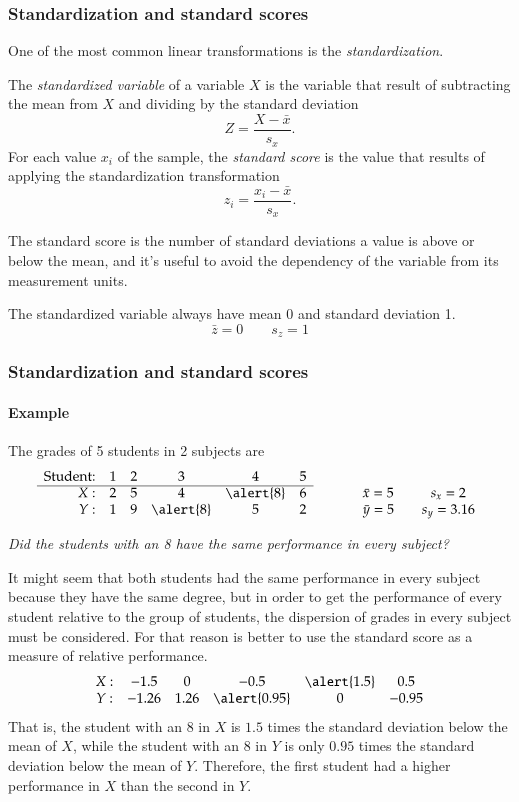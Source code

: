 \begin{frame}
\frametitle{Standardization and standard scores}
One of the most common linear transformations is the \emph{standardization}.
\begin{definition}
The \emph{standardized variable} of a variable $X$ is the variable that result of subtracting the mean from $X$ and
dividing by the standard deviation 
\[
Z=\frac{X-\bar x}{s_{x}}.
\]
For each value $x_i$ of the sample, the \emph{standard score} is the value that results of applying the standardization
transformation
\[
z_i=\frac{x_i-\bar x}{s_{x}}.
\]
\end{definition}

The standard score is the number of standard deviations a value is above or below the mean, and it's useful to avoid
the dependency of the variable from its measurement units.

The standardized variable always have mean 0 and standard deviation 1.  
\[
\bar z = 0 \qquad s_{z} = 1
\]
\end{frame}


\begin{frame}
\frametitle{Standardization and standard scores}
\framesubtitle{Example}
The grades of 5 students in 2 subjects are
\[
\begin{array}{rccccccccc}
\mbox{Student:} & 1 & 2 & 3 & 4 & 5\\ \cline{1-6}
X: & 2 & 5 & 4 & \alert{8} & 6 & \qquad & \bar x = 5 & \quad s_x = 2\\
Y: & 1 & 9 & \alert{8} & 5 & 2 & \qquad & \bar y = 5 & \quad s_y = 3.16\\
\end{array}
\]
\begin{center}
\emph{Did the students with an 8 have the same performance in every subject?}
\end{center}
It might seem that both students had the same performance in every subject because they have the same
degree, but in order to get the performance of every student relative to the group of students, the dispersion
of grades in every subject must be considered.
For that reason is better to use the standard score as a measure of relative performance. 
\[
\begin{array}{cccccc}
X: & -1.5 & 0 & -0.5 & \alert{1.5} & 0.5 \\
Y: & -1.26 & 1.26 & \alert{0.95} & 0 & -0.95\\
\end{array}
\]
That is, the student with an 8 in $X$ is $1.5$ times the standard deviation below the mean of $X$, while the student
with an 8 in $Y$ is only $0.95$ times the standard deviation below the mean of $Y$. 
Therefore, the first student had a higher performance in $X$ than the second in $Y$.
\end{frame}


